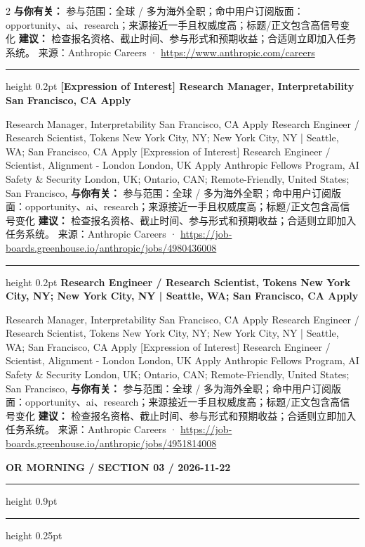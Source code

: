 \documentclass[10.5pt]{ctexart}
\begin{document}
\begin{multicols}{2}
\textbf{与你有关：} 参与范围：全球 / 多为海外全职；命中用户订阅版面：opportunity、ai、research；来源接近一手且权威度高；标题/正文包含高信号变化
\textbf{建议：} 检查报名资格、截止时间、参与形式和预期收益；合适则立即加入任务系统。
{\footnotesize\color{ormuted} 来源：Anthropic Careers · \url{https://www.anthropic.com/careers}}
\vspace{2mm}
\hrule height 0.2pt
\vspace{2mm}
{\large\bfseries [Expression of Interest] Research Manager, Interpretability San Francisco, CA Apply}\par
[Expression of Interest] Research Manager, Interpretability San Francisco, CA Apply Research Engineer / Research Scientist, Tokens New York City, NY; New York City, NY | Seattle, WA; San Francisco, CA Apply [Expression of Interest] Research Engineer / Scientist, Alignment - London London, UK Apply Anthropic Fellows Program, AI Safety \& Security London, UK; Ontario, CAN; Remote-Friendly, United States; San Francisco, 
\textbf{与你有关：} 参与范围：全球 / 多为海外全职；命中用户订阅版面：opportunity、ai、research；来源接近一手且权威度高；标题/正文包含高信号变化
\textbf{建议：} 检查报名资格、截止时间、参与形式和预期收益；合适则立即加入任务系统。
{\footnotesize\color{ormuted} 来源：Anthropic Careers · \url{https://job-boards.greenhouse.io/anthropic/jobs/4980436008}}
\vspace{2mm}
\hrule height 0.2pt
\vspace{2mm}
{\large\bfseries Research Engineer / Research Scientist, Tokens New York City, NY; New York City, NY | Seattle, WA; San Francisco, CA Apply}\par
[Expression of Interest] Research Manager, Interpretability San Francisco, CA Apply Research Engineer / Research Scientist, Tokens New York City, NY; New York City, NY | Seattle, WA; San Francisco, CA Apply [Expression of Interest] Research Engineer / Scientist, Alignment - London London, UK Apply Anthropic Fellows Program, AI Safety \& Security London, UK; Ontario, CAN; Remote-Friendly, United States; San Francisco, 
\textbf{与你有关：} 参与范围：全球 / 多为海外全职；命中用户订阅版面：opportunity、ai、research；来源接近一手且权威度高；标题/正文包含高信号变化
\textbf{建议：} 检查报名资格、截止时间、参与形式和预期收益；合适则立即加入任务系统。
{\footnotesize\color{ormuted} 来源：Anthropic Careers · \url{https://job-boards.greenhouse.io/anthropic/jobs/4951814008}}
\end{multicols}
\newpage
{\small\bfseries OR MORNING / SECTION 03 / 2026-11-22}
\vspace{2mm}
\hrule height 0.9pt
\vspace{1.5mm}
\hrule height 0.25pt
\vspace{4mm}
\end{document}
